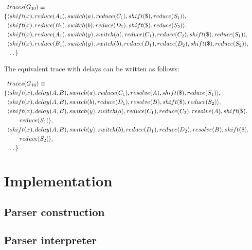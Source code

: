 \documentclass[11pt]{article}
\begin{document}
\parbox{.3\textwidth}{\begin{align*}
&traces(G_{10}) \equiv \\
\{ & \langle shift(x), reduce(A_1), switch(a), reduce(C_1), shift(\$), reduce(S_1) \rangle,\\
   & \langle shift(x), reduce(B_1), switch(b), reduce(D_1), shift(\$), reduce(S_2) \rangle,\\
   & \langle shift(x), reduce(A_1), switch(y), switch(a), reduce(C_1), reduce(C_2), shift(\$), reduce(S_1) \rangle,\\
   & \langle shift(x), reduce(B_1), switch(y), switch(b), reduce(D_1), reduce(D_2), shift(\$), reduce(S_2) \rangle,\\
   & \textellipsis \}
\end{align*}}

The equivalent trace with delays can be written as follows:

\parbox{.3\textwidth}{\begin{align*}
&traces(G_{10}) \equiv \\
 \{ & \langle shift(x), delay(A, B), switch(a), reduce(C_1), resolve(A), shift(\$), reduce(S_1) \rangle,\\
    & \langle shift(x), delay(A, B), switch(b), reduce(D_1), resolve(B), shift(\$), reduce(S_2) \rangle,\\
    & \langle shift(x), delay(A, B), switch(y), switch(a), reduce(C_1), reduce(C_2), resolve(A), shift(\$), \\&\qquad reduce(S_1) \rangle,\\
    & \langle shift(x), delay(A, B), switch(y), switch(b), reduce(D_1), reduce(D_2), resolve(B), shift(\$), \\&\qquad reduce(S_2) \rangle,\\
    & \textellipsis \}
\end{align*}}


\section{Implementation}
\subsection{Parser construction}
\subsection{Parser interpreter}
\end{document}
